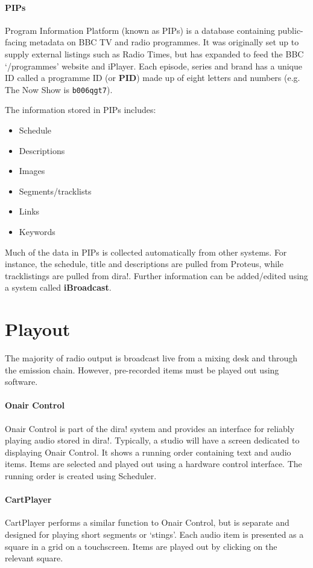 \paragraph{PIPs}\label{sec:pips}
Program Information Platform (known as PIPs) is a database containing
public-facing metadata on BBC TV and radio programmes. It was originally set up
to supply external listings such as Radio Times, but has expanded to feed
the BBC `/programmes' website and iPlayer. Each episode, series and brand has a
unique ID called a programme ID (or \textbf{PID}) made up of eight letters and
numbers (e.g. The Now Show is \texttt{b006qgt7}).

The information stored in PIPs includes:
\begin{itemize}
  \item Schedule
  \item Descriptions
  \item Images
  \item Segments/tracklists
  \item Links
  \item Keywords
\end{itemize}

Much of the data in PIPs is collected automatically from other systems. For
instance, the schedule, title and descriptions are pulled from Proteus, while
tracklistings are pulled from dira!. Further information can be added/edited
using a system called \textbf{iBroadcast}.


\section{Playout}
The majority of radio output is broadcast live from a mixing desk and through
the emission chain. However, pre-recorded items must be played out using
software.

\paragraph{Onair Control}
Onair Control is part of the dira! system and provides an interface for
reliably playing audio stored in dira!. Typically, a studio will have a screen
dedicated to displaying Onair Control. It shows a running order containing
text and audio items. Items are selected and played out using a hardware
control interface. The running order is created using Scheduler. 

\paragraph{CartPlayer}
CartPlayer performs a similar function to Onair Control, but is separate and
designed for playing short segments or `stings'. Each audio item is presented
as a square in a grid on a touchscreen. Items are played out by clicking on the
relevant square.

